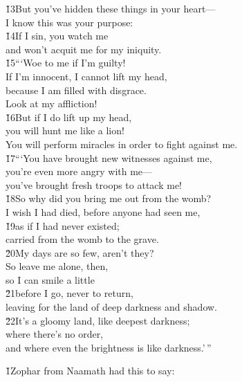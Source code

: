 \begin{poetry}
\poeml \v{13}But you've hidden these things in your heart--- \\
\poemll    I know this was your purpose: \\
\poeml \v{14}If I sin, you watch me \\
\poemll    and won't acquit me for my iniquity. \\
\poeml \v{15}```Woe to me if I'm guilty! \\
\poemll    If I'm innocent, I cannot lift my head, \\
\poeml because I am filled with disgrace. \\
\poemll    Look at my affliction! \\
\poeml \v{16}But if I do lift up my head, \\
\poemll    you will hunt me like a lion! \\
\poemlll       You will perform miracles in order to fight against me. \\
\poeml \v{17}```You have brought new witnesses against me, \\
\poemll    you're even more angry with me--- \\
\poemlll       you've brought fresh troops to attack me! \\
\poeml \v{18}So why did you bring me out from the womb? \\
\poemll    I wish I had died, before anyone had seen me, \\
\poeml \v{19}as if I had never existed; \\
\poemll    carried from the womb to the grave. \\
\poeml \v{20}My days are so few, aren't they? \\
\poemll    So leave me alone, then, \\
\poemlll       so I can smile a little \\
\poeml \v{21}before I go, never to return, \\
\poemll    leaving for the land of deep darkness and shadow. \\
\poeml \v{22}It's a gloomy land, like deepest darkness; \\
\poemll    where there's no order, \\
\poemlll       and where even the brightness is like darkness.'\,''
\end{poetry}

\v{1}Zophar from Naamath had this to say:

